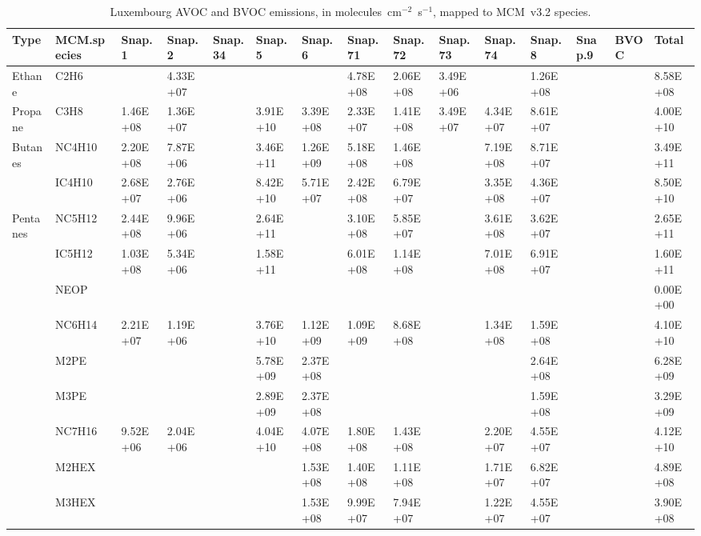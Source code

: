 \tiny
\begin{longtable}{lllllllllllllll}
	\caption{Luxembourg AVOC and BVOC emissions, in molecules~cm$^{-2}$~s$^{-1}$, mapped to MCM~v3.2 species.}\\%
	\hline \hline
	\textbf{Type} & \textbf{MCM.species} & \textbf{Snap.1} & \textbf{Snap.2} & \textbf{Snap.34} & \textbf{Snap.5} & \textbf{Snap.6} & \textbf{Snap.71} & \textbf{Snap.72} & \textbf{Snap.73} & \textbf{Snap.74} & \textbf{Snap.8} & \textbf{Snap.9} & \textbf{BVOC} & \textbf{Total}\\
	\endhead
	\hline
	Ethane & C2H6 &  & 4.33E+07 &  &  &  & 4.78E+08 & 2.06E+08 & 3.49E+06 &  & 1.26E+08 &  &  & 8.58E+08 \\
	\hline Propane & C3H8 & 1.46E+08 & 1.36E+07 &  & 3.91E+10 & 3.39E+08 & 2.33E+07 & 1.41E+08 & 3.49E+07 & 4.34E+07 & 8.61E+07 &  &  & 4.00E+10 \\ \hline
	\multirow{2}{*}{Butanes} & NC4H10 & 2.20E+08 & 7.87E+06 &  & 3.46E+11 & 1.26E+09 & 5.18E+08 & 1.46E+08 &  & 7.19E+08 & 8.71E+07 &  &  & 3.49E+11 \\
	 & IC4H10 & 2.68E+07 & 2.76E+06 &  & 8.42E+10 & 5.71E+07 & 2.42E+08 & 6.79E+07 &  & 3.35E+08 & 4.36E+07 &  &  & 8.50E+10 \\
	\hline \multirow{3}{*}{Pentanes} & NC5H12 & 2.44E+08 & 9.96E+06 &  & 2.64E+11 &  & 3.10E+08 & 5.85E+07 &  & 3.61E+08 & 3.62E+07 &  &  & 2.65E+11 \\
	 & IC5H12 & 1.03E+08 & 5.34E+06 &  & 1.58E+11 &  & 6.01E+08 & 1.14E+08 &  & 7.01E+08 & 6.91E+07 &  &  & 1.60E+11 \\
	 & NEOP &  &  &  &  &  &  &  &  &  &  &  &  & 0.00E+00 \\
	\hline \parbox[t]{2mm}{} & NC6H14 & 2.21E+07 & 1.19E+06 &  & 3.76E+10 & 1.12E+09 & 1.09E+09 & 8.68E+08 &  & 1.34E+08 & 1.59E+08 &  &  & 4.10E+10 \\
	 & M2PE &  &  &  & 5.78E+09 & 2.37E+08 &  &  &  &  & 2.64E+08 &  &  & 6.28E+09 \\
	 & M3PE &  &  &  & 2.89E+09 & 2.37E+08 &  &  &  &  & 1.59E+08 &  &  & 3.29E+09 \\
	 & NC7H16 & 9.52E+06 & 2.04E+06 &  & 4.04E+10 & 4.07E+08 & 1.80E+08 & 1.43E+08 &  & 2.20E+07 & 4.55E+07 &  &  & 4.12E+10 \\
	 & M2HEX &  &  &  &  & 1.53E+08 & 1.40E+08 & 1.11E+08 &  & 1.71E+07 & 6.82E+07 &  &  & 4.89E+08 \\
	 & M3HEX &  &  &  &  & 1.53E+08 & 9.99E+07 & 7.94E+07 &  & 1.22E+07 & 4.55E+07 &  &  & 3.90E+08 \\

\end{longtable}
